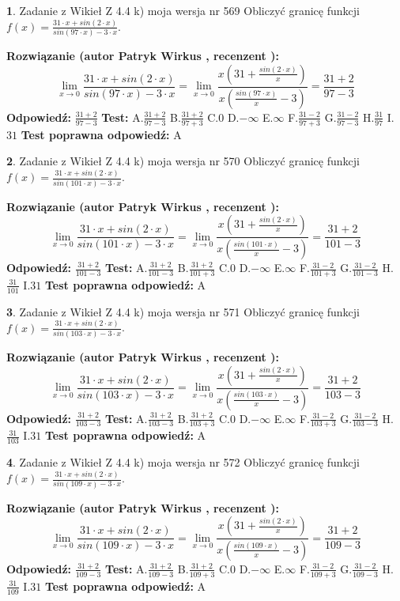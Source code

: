 \documentclass[12pt, a4paper]{article}
\theoremstyle{definition} %
\newtheorem{zad}{}
\newcommand{\zadStart}[1]{\begin{zad}#1\newline}
\newcommand{\zadStop}{\end{zad}}
\newcommand{\rozwStart}[2]{\noindent \textbf{Rozwiązanie (autor #1 , recenzent #2): }\newline}
\newcommand{\rozwStop}{\newline}
\newcommand{\odpStart}{\noindent \textbf{Odpowiedź:}\newline}
\newcommand{\odpStop}{\newline}
\newcommand{\testStart}{\noindent \textbf{Test:}\newline}
\newcommand{\testStop}{\newline}
\newcommand{\kluczStart}{\noindent \textbf{Test poprawna odpowiedź:}\newline}
\newcommand{\kluczStop}{\newline}
\begin{document}
\zadStart{Zadanie z Wikieł Z 4.4 k) moja wersja nr 569}
Obliczyć granicę funkcji $f(x)=\frac{31\cdot x +sin(2\cdot x)}{sin(97\cdot x) -3\cdot x}$.
\zadStop
\rozwStart{Patryk Wirkus}{}
$$\lim\limits_{x\to 0}\frac{31\cdot x +sin(2\cdot x)}{sin(97\cdot x) -3\cdot x}
=\lim\limits_{x\to 0}\frac{x(31+\frac{sin(2\cdot x)}{x})}{x(\frac{sin(97\cdot x)}{x}-3)}
=\frac{31+2}{97-3}$$
\rozwStop
\odpStart
$\frac{31+2}{97-3}$
\odpStop
\testStart
A.$\frac{31+2}{97-3}$
B.$\frac{31+2}{97+3}$
C.$0$
D.$-\infty$
E.$\infty$
F.$\frac{31-2}{97+3}$
G.$\frac{31-2}{97-3}$
H.$\frac{31}{97}$
I.$31$
\testStop
\kluczStart
A
\kluczStop



\zadStart{Zadanie z Wikieł Z 4.4 k) moja wersja nr 570}
Obliczyć granicę funkcji $f(x)=\frac{31\cdot x +sin(2\cdot x)}{sin(101\cdot x) -3\cdot x}$.
\zadStop
\rozwStart{Patryk Wirkus}{}
$$\lim\limits_{x\to 0}\frac{31\cdot x +sin(2\cdot x)}{sin(101\cdot x) -3\cdot x}
=\lim\limits_{x\to 0}\frac{x(31+\frac{sin(2\cdot x)}{x})}{x(\frac{sin(101\cdot x)}{x}-3)}
=\frac{31+2}{101-3}$$
\rozwStop
\odpStart
$\frac{31+2}{101-3}$
\odpStop
\testStart
A.$\frac{31+2}{101-3}$
B.$\frac{31+2}{101+3}$
C.$0$
D.$-\infty$
E.$\infty$
F.$\frac{31-2}{101+3}$
G.$\frac{31-2}{101-3}$
H.$\frac{31}{101}$
I.$31$
\testStop
\kluczStart
A
\kluczStop



\zadStart{Zadanie z Wikieł Z 4.4 k) moja wersja nr 571}
Obliczyć granicę funkcji $f(x)=\frac{31\cdot x +sin(2\cdot x)}{sin(103\cdot x) -3\cdot x}$.
\zadStop
\rozwStart{Patryk Wirkus}{}
$$\lim\limits_{x\to 0}\frac{31\cdot x +sin(2\cdot x)}{sin(103\cdot x) -3\cdot x}
=\lim\limits_{x\to 0}\frac{x(31+\frac{sin(2\cdot x)}{x})}{x(\frac{sin(103\cdot x)}{x}-3)}
=\frac{31+2}{103-3}$$
\rozwStop
\odpStart
$\frac{31+2}{103-3}$
\odpStop
\testStart
A.$\frac{31+2}{103-3}$
B.$\frac{31+2}{103+3}$
C.$0$
D.$-\infty$
E.$\infty$
F.$\frac{31-2}{103+3}$
G.$\frac{31-2}{103-3}$
H.$\frac{31}{103}$
I.$31$
\testStop
\kluczStart
A
\kluczStop



\zadStart{Zadanie z Wikieł Z 4.4 k) moja wersja nr 572}
Obliczyć granicę funkcji $f(x)=\frac{31\cdot x +sin(2\cdot x)}{sin(109\cdot x) -3\cdot x}$.
\zadStop
\rozwStart{Patryk Wirkus}{}
$$\lim\limits_{x\to 0}\frac{31\cdot x +sin(2\cdot x)}{sin(109\cdot x) -3\cdot x}
=\lim\limits_{x\to 0}\frac{x(31+\frac{sin(2\cdot x)}{x})}{x(\frac{sin(109\cdot x)}{x}-3)}
=\frac{31+2}{109-3}$$
\rozwStop
\odpStart
$\frac{31+2}{109-3}$
\odpStop
\testStart
A.$\frac{31+2}{109-3}$
B.$\frac{31+2}{109+3}$
C.$0$
D.$-\infty$
E.$\infty$
F.$\frac{31-2}{109+3}$
G.$\frac{31-2}{109-3}$
H.$\frac{31}{109}$
I.$31$
\testStop
\kluczStart
A
\kluczStop
\end{document}
